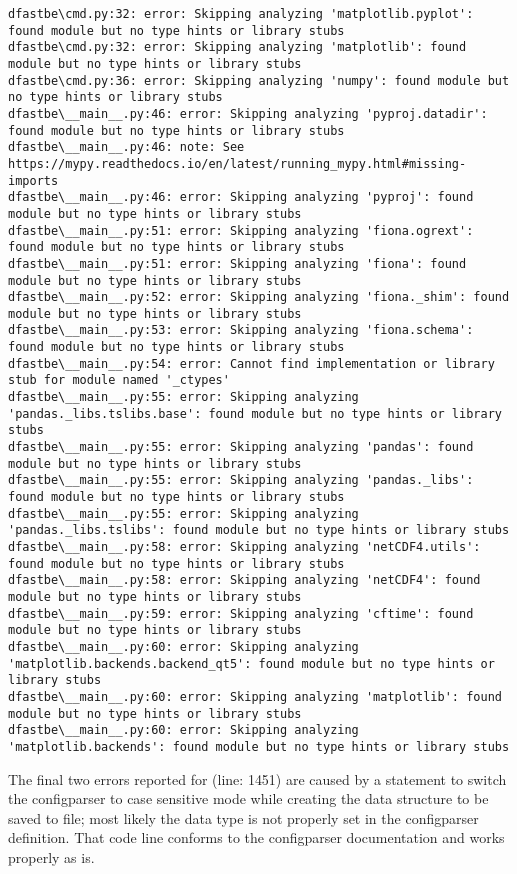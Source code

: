 \begin{Verbatim}[fontsize=\tiny]
dfastbe\cmd.py:32: error: Skipping analyzing 'matplotlib.pyplot': found module but no type hints or library stubs
dfastbe\cmd.py:32: error: Skipping analyzing 'matplotlib': found module but no type hints or library stubs
dfastbe\cmd.py:36: error: Skipping analyzing 'numpy': found module but no type hints or library stubs
dfastbe\__main__.py:46: error: Skipping analyzing 'pyproj.datadir': found module but no type hints or library stubs
dfastbe\__main__.py:46: note: See https://mypy.readthedocs.io/en/latest/running_mypy.html#missing-imports
dfastbe\__main__.py:46: error: Skipping analyzing 'pyproj': found module but no type hints or library stubs
dfastbe\__main__.py:51: error: Skipping analyzing 'fiona.ogrext': found module but no type hints or library stubs
dfastbe\__main__.py:51: error: Skipping analyzing 'fiona': found module but no type hints or library stubs
dfastbe\__main__.py:52: error: Skipping analyzing 'fiona._shim': found module but no type hints or library stubs
dfastbe\__main__.py:53: error: Skipping analyzing 'fiona.schema': found module but no type hints or library stubs
dfastbe\__main__.py:54: error: Cannot find implementation or library stub for module named '_ctypes'
dfastbe\__main__.py:55: error: Skipping analyzing 'pandas._libs.tslibs.base': found module but no type hints or library stubs
dfastbe\__main__.py:55: error: Skipping analyzing 'pandas': found module but no type hints or library stubs
dfastbe\__main__.py:55: error: Skipping analyzing 'pandas._libs': found module but no type hints or library stubs
dfastbe\__main__.py:55: error: Skipping analyzing 'pandas._libs.tslibs': found module but no type hints or library stubs
dfastbe\__main__.py:58: error: Skipping analyzing 'netCDF4.utils': found module but no type hints or library stubs
dfastbe\__main__.py:58: error: Skipping analyzing 'netCDF4': found module but no type hints or library stubs
dfastbe\__main__.py:59: error: Skipping analyzing 'cftime': found module but no type hints or library stubs
dfastbe\__main__.py:60: error: Skipping analyzing 'matplotlib.backends.backend_qt5': found module but no type hints or library stubs
dfastbe\__main__.py:60: error: Skipping analyzing 'matplotlib': found module but no type hints or library stubs
dfastbe\__main__.py:60: error: Skipping analyzing 'matplotlib.backends': found module but no type hints or library stubs
\end{Verbatim}

The final two errors reported for  (line: 1451) are caused by a statement to switch the configparser to case sensitive mode while creating the data structure to be saved to file; most likely the data type is not properly set in the configparser definition.
That code line conforms to the configparser documentation and works properly as is.

